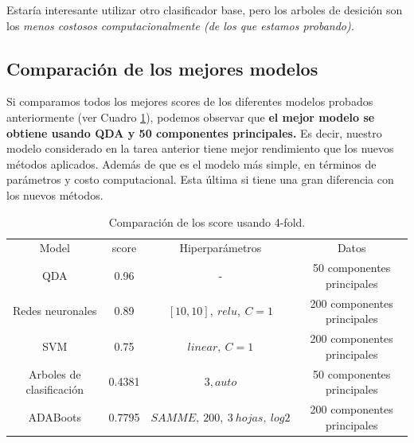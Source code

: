 \documentclass[paper=letter, fontsize=11pt]{scrartcl}
\numberwithin{equation}{section} %
\numberwithin{figure}{section} %
\numberwithin{table}{section} %
\begin{document}
Estaría interesante utilizar otro clasificador base, pero los arboles de desición son los \textit{menos costosos computacionalmente (de los que estamos probando).}

\subsection{Comparación de los mejores modelos}
Si comparamos todos los mejores scores de los diferentes modelos probados anteriormente (ver Cuadro \ref{compa}), podemos observar que \textbf{el mejor modelo se obtiene usando QDA y 50 componentes principales.} Es decir, nuestro modelo considerado en la tarea anterior tiene mejor rendimiento que los nuevos métodos aplicados. Además de que es el modelo más simple, en términos de parámetros y costo computacional. Esta última si tiene una gran diferencia con los nuevos métodos. 

\begin{table}[H]
\centering
\begin{tabular}{cccc}
\hline \hline
Model & score &Hiperparámetros &Datos \\
QDA & 0.96 & -&50 componentes principales\\
Redes neuronales & 0.89 &$[10,10],\ relu,\ C=1$&200 componentes principales\\
SVM & 0.75  &$linear, \ C=1$ &200 componentes principales\\
Arboles de clasificación & 0.4381 & $3, auto$& 50 componentes principales\\
ADABoots & 0.7795&$SAMME,\ 200,\ 3 \ hojas,\ log2$ &200 componentes principales  \\ \hline \hline 
\end{tabular}
\caption{Comparación de los score usando 4-fold.}\label{compa}
\end{table}
\end{document}
